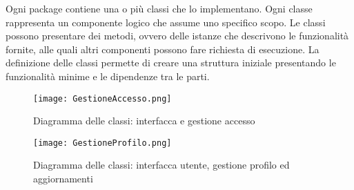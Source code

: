 Ogni package contiene una o più classi che lo implementano.
Ogni classe rappresenta un componente logico che assume uno specifico scopo.
Le classi possono presentare dei metodi, ovvero delle istanze che descrivono le funzionalità fornite,
alle quali altri componenti possono fare richiesta di esecuzione.
La definizione delle classi permette di creare una struttura iniziale presentando le funzionalità minime e 
le dipendenze tra le parti.

\begin{figure}[h!]
    \begin{center}
        \texttt{[image: GestioneAccesso.png]}
        \caption{Diagramma delle classi: interfacca e gestione accesso}
    \end{center}
\end{figure}


\begin{figure}[h!]
    \begin{center}
        \texttt{[image: GestioneProfilo.png]}
        \caption{Diagramma delle classi: interfacca utente, gestione profilo ed aggiornamenti}
    \end{center}
\end{figure}
\clearpage